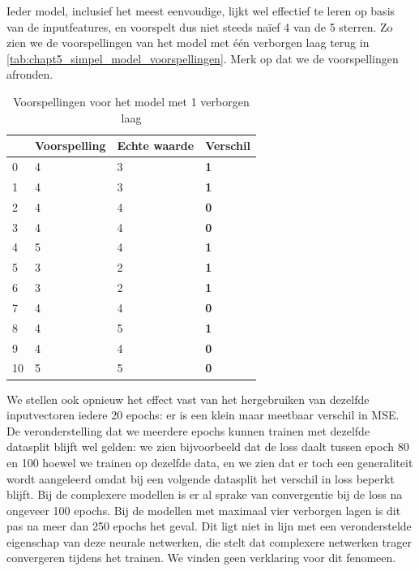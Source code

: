 Ieder model, inclusief het meest eenvoudige, lijkt wel effectief te leren op basis van de inputfeatures, en voorspelt dus niet steeds naïef 4 van de 5 sterren. Zo zien we de voorspellingen van het model met één verborgen laag terug in \autoref{tab:chapt5_simpel_model_voorspellingen}. Merk op dat we de voorspellingen afronden. 

\begin{table}[H]
    \centering
    \begin{tabular}{l|l|l|l}
       & Voorspelling & Echte waarde & Verschil   \\ \hline
    0  & 4            & 3            & \textbf{1} \\
    1  & 4            & 3            & \textbf{1} \\
    2  & 4            & 4            & \textbf{0} \\
    3  & 4            & 4            & \textbf{0} \\
    4  & 5            & 4            & \textbf{1} \\
    5  & 3            & 2            & \textbf{1} \\
    6  & 3            & 2            & \textbf{1} \\
    7  & 4            & 4            & \textbf{0} \\
    8  & 4            & 5            & \textbf{1} \\
    9  & 4            & 4            & \textbf{0} \\
    10 & 5            & 5            & \textbf{0}
    \end{tabular}
    \caption{Voorspellingen voor het model met 1 verborgen laag}
    \label{tab:chapt5_simpel_model_voorspellingen}
\end{table}




We stellen ook opnieuw het effect vast van het hergebruiken van dezelfde inputvectoren iedere 20 epochs: er is een klein maar meetbaar verschil in MSE. De veronderstelling dat we meerdere epochs kunnen trainen met dezelfde datasplit blijft wel gelden: we zien bijvoorbeeld dat de loss daalt tussen epoch 80 en 100 hoewel we trainen op dezelfde data, en we zien dat er toch een generaliteit wordt aangeleerd omdat bij een volgende datasplit het verschil in loss beperkt blijft.\newline
Bij de complexere modellen is er al sprake van convergentie bij de loss na ongeveer 100 epochs. Bij de modellen met maximaal vier verborgen lagen is dit pas na meer dan 250 epochs het geval. Dit ligt niet in lijn met een veronderstelde eigenschap van deze neurale netwerken, die stelt dat complexere netwerken trager convergeren tijdens het trainen. We vinden geen verklaring voor dit fenomeen.


